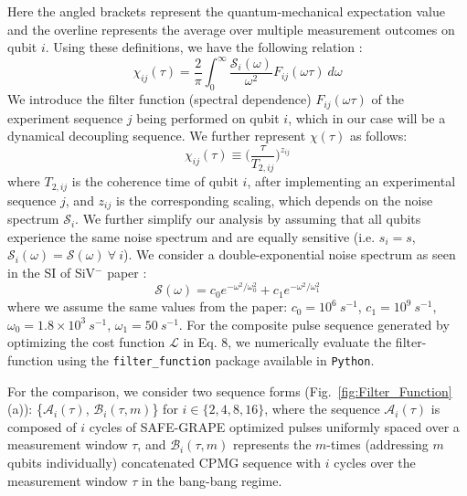\documentclass[%
 reprint,
 superscriptaddress,
 amsmath,amssymb,
 aps,
 prx,
]{revtex4-2}
\begin{document}
Here the angled brackets represent the quantum-mechanical expectation value and the overline represents the average over multiple measurement outcomes on qubit $i$. Using these definitions, we have the following relation \cite{Biercuk_2011}:
\begin{equation}
    \chi_{ij}(\tau) = \frac{2}{\pi}\int_{0}^{\infty}\frac{\mathcal{S}_{i}(\omega)}{\omega^2}F_{ij}(\omega\tau)~d\omega
\end{equation}
We introduce the filter function (spectral dependence) $F_{ij}(\omega\tau)$ of the experiment sequence $j$ being performed on qubit $i$, which in our case will be a dynamical decoupling sequence. We further represent $\chi(\tau)$ as follows:
\begin{equation}
    \chi_{ij}(\tau) \equiv \bigg(\frac{\tau}{T_{2,ij}}\bigg)^{z_{ij}}
\end{equation}
where $T_{2,ij}$ is the coherence time of qubit $i$, after implementing an experimental sequence $j$, and $z_{ij}$ is the corresponding scaling, which depends on the noise spectrum $\mathcal{S}_{i}$. We further simplify our analysis by assuming that all qubits experience the same noise spectrum and are equally sensitive (i.e. $s_{i} = s$, $\mathcal{S}_{i}(\omega) = \mathcal{S}(\omega)~\forall~i$). We consider a double-exponential noise spectrum as seen in the SI of SiV$^{-}$ paper \cite{Sukachev_2017}:
\begin{equation}
    \mathcal{S}(\omega) = c_{0} e^{-\omega^2/\omega_{0}^2} + c_{1} e^{-\omega^2/\omega_{1}^2}
\end{equation}
where we assume the same values from the paper: $c_{0} = 10^6~s^{-1}$, $c_{1} = 10^9~s^{-1}$, $\omega_{0} = 1.8\times10^{3}~s^{-1}$, $\omega_{1} = 50~s^{-1}$. For the composite pulse sequence generated by optimizing the cost function $\mathcal{L}$ in Eq. 8, we numerically evaluate the filter-function using the \texttt{filter\_function} package \cite{hangleiter_2024_11192918} available in \texttt{Python}.
 
For the comparison, we consider two sequence forms (Fig.~\ref{fig:Filter_Function}(a)): \{$\mathcal{A}_{i}(\tau)$, $\mathcal{B}_{i}(\tau, m)$\} for $i\in\{2,4,8,16\}$, where the sequence $\mathcal{A}_{i}(\tau)$ is composed of $i$ cycles of SAFE-GRAPE optimized pulses uniformly spaced over a measurement window $\tau$, and $\mathcal{B}_{i}(\tau, m)$ represents the $m$-times (addressing $m$ qubits individually) concatenated CPMG sequence with $i$ cycles over the measurement window $\tau$ in the bang-bang regime.
\end{document}

